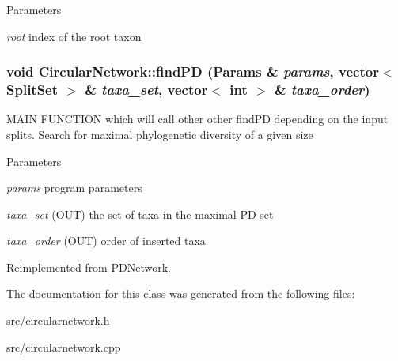 \begin{DoxyParams}{Parameters}
\item[{\em root}]index of the root taxon \end{DoxyParams}
\hypertarget{classCircularNetwork_a2d7a229ba82a87667c7f194249484f38}{
\subsubsection[{findPD}]{\setlength{\rightskip}{0pt plus 5cm}void CircularNetwork::findPD ({\bf Params} \& {\em params}, \/  vector$<$ {\bf SplitSet} $>$ \& {\em taxa\_\-set}, \/  vector$<$ int $>$ \& {\em taxa\_\-order})}}
\label{classCircularNetwork_a2d7a229ba82a87667c7f194249484f38}
MAIN FUNCTION which will call other other findPD depending on the input splits. Search for maximal phylogenetic diversity of a given size 
\begin{DoxyParams}{Parameters}
\item[{\em params}]program parameters \item[{\em taxa\_\-set}](OUT) the set of taxa in the maximal PD set \item[{\em taxa\_\-order}](OUT) order of inserted taxa \end{DoxyParams}


Reimplemented from \hyperlink{classPDNetwork_ae481d52c7f411e1fa1f768746329130b}{PDNetwork}.

The documentation for this class was generated from the following files:\begin{DoxyCompactItemize}
\item 
src/circularnetwork.h\item 
src/circularnetwork.cpp\end{DoxyCompactItemize}
